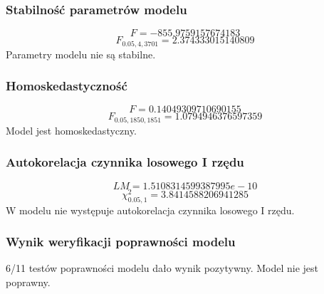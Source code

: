 \subsubsection{Stabilność parametrów modelu}
\[F = -855.9759157674183\]
\[F_{0.05, 4, 3701} = 2.374333015140809\]
Parametry modelu nie są stabilne.
\subsubsection{Homoskedastyczność}
\[F = 0.14049309710690155\]
\[F_{0.05, 1850, 1851} = 1.0794946376597359\]
Model jest homoskedastyczny.
\subsubsection{Autokorelacja czynnika losowego I rzędu}
\[LM = 1.5108314599387995e-10\]
\[\chi^2_{0.05, 1} = 3.8414588206941285\]
W modelu nie występuje autokorelacja czynnika losowego I rzędu.
\subsubsection{Wynik weryfikacji poprawności modelu}
6/11 testów poprawności modelu dało wynik pozytywny. Model nie jest poprawny.
